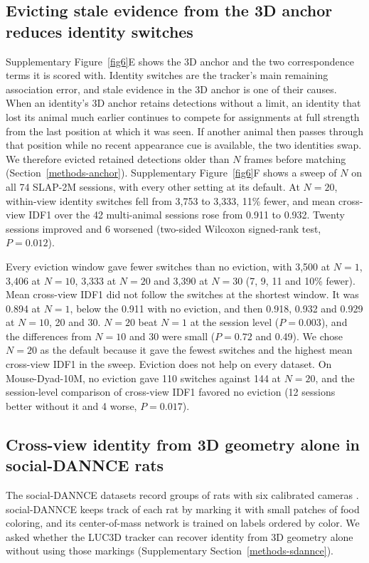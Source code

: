 \documentclass[pdflatex, sn-nature]{sn-jnl}
\theoremstyle{thmstyleone}%
\theoremstyle{thmstyletwo}%
\theoremstyle{thmstylethree}%
\begin{document}
\subsection{Evicting stale evidence from the 3D anchor reduces identity switches}\label{subsec2-9}

Supplementary Figure~\ref{fig6}E shows the 3D anchor and the two correspondence terms it is scored with. Identity switches are the tracker's main remaining association error, and stale evidence in the 3D anchor is one of their causes. When an identity's 3D anchor retains detections without a limit, an identity that lost its animal much earlier continues to compete for assignments at full strength from the last position at which it was seen. If another animal then passes through that position while no recent appearance cue is available, the two identities swap. We therefore evicted retained detections older than $N$ frames before matching (Section~\ref{methods-anchor}). Supplementary Figure~\ref{fig6}F shows a sweep of $N$ on all 74 SLAP-2M sessions, with every other setting at its default. At $N = 20$, within-view identity switches fell from 3,753 to 3,333, 11\% fewer, and mean cross-view IDF1 over the 42 multi-animal sessions rose from 0.911 to 0.932. Twenty sessions improved and 6 worsened (two-sided Wilcoxon signed-rank test, $P = 0.012$).

Every eviction window gave fewer switches than no eviction, with 3,500 at $N = 1$, 3,406 at $N = 10$, 3,333 at $N = 20$ and 3,390 at $N = 30$ (7, 9, 11 and 10\% fewer). Mean cross-view IDF1 did not follow the switches at the shortest window. It was 0.894 at $N = 1$, below the 0.911 with no eviction, and then 0.918, 0.932 and 0.929 at $N = 10$, 20 and 30. $N = 20$ beat $N = 1$ at the session level ($P = 0.003$), and the differences from $N = 10$ and 30 were small ($P = 0.72$ and 0.49). We chose $N = 20$ as the default because it gave the fewest switches and the highest mean cross-view IDF1 in the sweep. Eviction does not help on every dataset. On Mouse-Dyad-10M, no eviction gave 110 switches against 144 at $N = 20$, and the session-level comparison of cross-view IDF1 favored no eviction (12 sessions better without it and 4 worse, $P = 0.017$).

\subsection{Cross-view identity from 3D geometry alone in social-DANNCE rats}\label{subsec-sdannce}

The social-DANNCE datasets record groups of rats with six calibrated cameras \citep{Klibaite2025}. social-DANNCE keeps track of each rat by marking it with small patches of food coloring, and its center-of-mass network is trained on labels ordered by color. We asked whether the LUC3D tracker can recover identity from 3D geometry alone without using those markings (Supplementary Section~\ref{methods-sdannce}).
\end{document}
